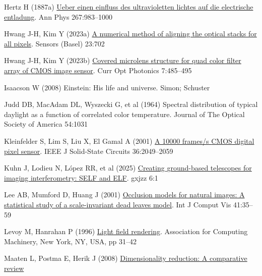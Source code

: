 \documentclass[
  letterpaper,
]{book}
\newlength{\cslhangindent}
\newenvironment{CSLReferences}[2] %
 {\begin{list}{}{%
  \setlength{\itemindent}{0pt}
  \setlength{\leftmargin}{0pt}
  \setlength{\parsep}{0pt}
  \ifodd #1
   \setlength{\leftmargin}{\cslhangindent}
   \setlength{\itemindent}{-1\cslhangindent}
  \fi
  \setlength{\itemsep}{#2\baselineskip}}}
 {\end{list}}
\begin{document}
\begin{CSLReferences}{1}{1}
Hertz H (1887a) \href{http://dx.doi.org/10.1002/andp.18872670827}{Ueber
einen einfluss des ultravioletten lichtes auf die electrische
entladung}. Ann Phys 267:983--1000

Hwang J-H, Kim Y (2023a) \href{http://dx.doi.org/10.3390/s23020702}{A
numerical method of aligning the optical stacks for all pixels}. Sensors
(Basel) 23:702

Hwang J-H, Kim Y (2023b)
\href{http://dx.doi.org/10.1364/COPP.7.000485}{Covered microlens
structure for quad color filter array of {CMOS} image sensor}. Curr Opt
Photonics 7:485--495

Isaacson W (2008) Einstein: His life and universe. Simon; Schuster

Judd DB, MacAdam DL, Wyszecki G, et al (1964) Spectral distribution of
typical daylight as a function of correlated color temperature. Journal
of The Optical Society of America 54:1031

Kleinfelder S, Lim S, Liu X, El Gamal A (2001)
\href{http://dx.doi.org/10.1109/4.972156}{A 10000 frames/s {CMOS}
digital pixel sensor}. IEEE J Solid-State Circuits 36:2049--2059

Kuhn J, Lodieu N, López RR, et al (2025)
\href{http://dx.doi.org/10.37188/lam.2025.033}{Creating ground-based
telescopes for imaging interferometry: {SELF} and {ELF}}. gxjzz 6:1

Lee AB, Mumford D, Huang J (2001)
\href{http://dx.doi.org/10.1023/a:1011109015675}{Occlusion models for
natural images: A statistical study of a scale-invariant dead leaves
model}. Int J Comput Vis 41:35--59

Levoy M, Hanrahan P (1996)
\href{https://doi.org/10.1145/237170.237199}{Light field rendering}.
Association for Computing Machinery, New York, NY, USA, pp 31--42

Maaten L, Postma E, Herik J (2008)
\href{https://www.researchgate.net/profile/Eric-Postma/publication/228657549_Dimensionality_Reduction_A_Comparative_Review/links/0046353a3047fc2863000000/Dimensionality-Reduction-A-Comparative-Review.pdf}{Dimensionality
reduction: A comparative review}


\end{CSLReferences}
\end{document}
